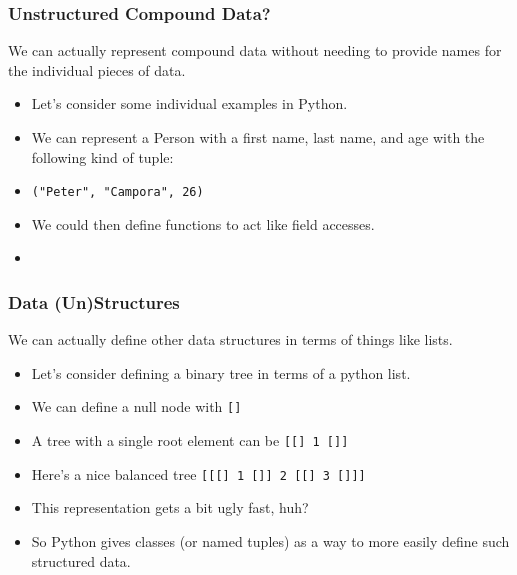 \documentclass{beamer}
\begin{document}
\begin{frame}
  \frametitle{Unstructured Compound Data?}
  We can actually represent compound data without needing to provide names for the individual pieces of data.
  \begin{itemize}
  \item<2-> Let's consider some individual examples in Python.
  \item<3-> We can represent a Person with a first name, last name, and age with the following kind of tuple:
  \item<4-> \texttt{("Peter", "Campora", 26)}
  \item<5-> We could then define functions to act like field accesses.
  \item<6-> \fstName
  \end{itemize}
\end{frame}

\begin{frame}
  \frametitle{Data (Un)Structures}
  We can actually define other data structures in terms of things like lists.
  \begin{itemize}
  \item<2-> Let's consider defining a binary tree in terms of a python list.
  \item<3-> We can define a null node with \texttt{[]}
  \item<4-> A tree with a single root element can be \texttt{[[] 1 []]}
  \item<5-> Here's a nice balanced tree \texttt{[[[] 1 []] 2 [[] 3 []]]}
  \item<6-> This representation gets a bit ugly fast, huh?
  \item<7-> So Python gives classes (or named tuples) as a way to more easily
    define such structured data.
  \end{itemize}
\end{frame}
\end{document}
